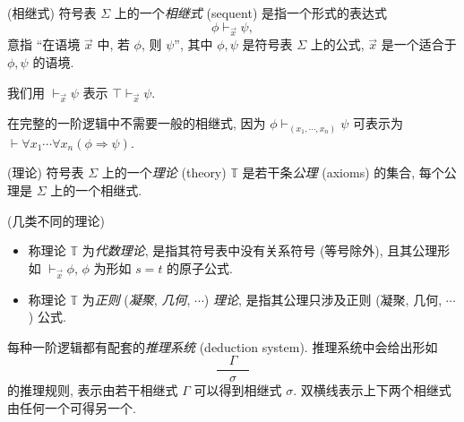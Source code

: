 \begin{definition}
	[label={sequents}]
	{(相继式)}
	符号表 $\Sigma$ 上的一个\emph{相继式} (sequent) 是指一个形式的表达式
	$$
	\phi \vdash_{\vec x} \psi,
	$$
	意指 ``在语境 $\vec x$ 中, 若 $\phi$, 则 $\psi$'', 其中 $\phi,\psi$ 是符号表 $\Sigma$ 上的公式,
	$\vec x$ 是一个适合于 $\phi,\psi$ 的语境.
	
	我们用 $\vdash_{\vec x} \psi$ 表示 $\top\vdash_{\vec x} \psi$.
\end{definition}

\begin{remark}
	[label={remark-full-first-order-logic-no-need-sequents}]
	{}
	在完整的一阶逻辑中不需要一般的相继式, 因为
	$\phi \vdash_{(x_1,\cdots,x_n)} \psi$ 可表示为
	$\vdash \forall x_1\cdots \forall x_n (\phi\Rightarrow \psi)$.
\end{remark}

\begin{definition}
	{(理论)}
	符号表 $\Sigma$ 上的一个\emph{理论} (theory) $\mathbb T$ 是若干条\emph{公理} (axioms) 的集合, 每个公理是 $\Sigma$ 上的一个相继式.
\end{definition}

\begin{definition}
	[label={kinds-of-theories}]
	{(几类不同的理论)}
	\begin{itemize}
		\item 称理论 $\mathbb T$ 为\emph{代数理论}, 是指其符号表中没有关系符号 (等号除外), 且其公理形如 $\vdash_{\vec x}\phi$, $\phi$ 为形如 $s=t$ 的原子公式.
		\item 称理论 $\mathbb T$ 为\emph{正则} (\emph{凝聚}, \emph{几何}, $\cdots$) \emph{理论}, 是指其公理只涉及正则 (凝聚, 几何, $\cdots$) 公式.
	\end{itemize}
\end{definition}


\newcommand{\sqc}[2]{\frac{\quad #1 \quad}{\quad #2 \quad}}
\newcommand{\sqqc}[2]{
	\begin{array}
		{c}
		#1 \\ \hline \hline #2
	\end{array}
}

每种一阶逻辑都有配套的\emph{推理系统} (deduction system). 推理系统中会给出形如
$$
\sqc{\Gamma}{\sigma}
$$
的推理规则, 表示由若干相继式 $\Gamma$ 可以得到相继式 $\sigma$.
双横线表示上下两个相继式由任何一个可得另一个.

